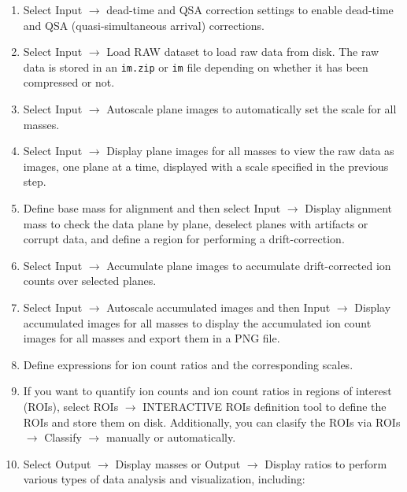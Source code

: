 \documentclass[a4paper, 11pt]{article}
\newcommand{\ttt}[1]{\texttt{#1}}
\newcommand{\lans}[1]{{\color{magenta}#1}}
\newcommand{\lanscb}[1]{{\color{darkgreen}#1}}
\newcommand{\lanstf}[1]{{\color{cyan}#1}}
\newcommand\ra{\rightarrow}
\newcounter{step}
\begin{document}
\begin{enumerate}

\item Select \lans{Input} $\ra$ \lans{dead-time and QSA correction settings} to enable dead-time and QSA (quasi-simultaneous arrival) corrections.

\item Select \lans{Input} $\ra$ \lans{Load RAW dataset} to load raw data from disk. The raw data is stored in an \ttt{im.zip} or \ttt{im} file depending on whether it has been compressed or not.

\item Select \lans{Input} $\ra$ \lans{Autoscale plane images} to automatically set the scale for all masses. 

\item Select \lans{Input} $\ra$ \lans{Display plane images for all masses} to view the raw data as images, one plane at a time, displayed with a scale specified in the previous step. 

\item Define \lanstf{base mass for alignment} and then select \lans{Input} $\ra$ \lans{Display alignment mass} to check the data plane by plane, \lanscb{deselect planes} with artifacts or corrupt data, and \lans{define a region} for performing a drift-correction. 

\item Select \lans{Input} $\ra$ \lans{Accumulate plane images} to accumulate drift-corrected ion counts over selected planes.  

\item Select \lans{Input} $\ra$ \lans{Autoscale accumulated images} and then \lans{Input} $\ra$ \lans{Display accumulated images for all masses} to display the accumulated ion count images for all masses and export them in a PNG file.

\item Define \lanstf{expressions} for ion count ratios and the corresponding \lanstf{scales}. 

\item If you want to quantify ion counts and ion count ratios in regions of interest (ROIs), select \lans{ROIs} $\ra$ \lans{INTERACTIVE ROIs definition tool} to define the ROIs and store them on disk. Additionally, you can clasify the ROIs via \lans{ROIs} $\ra$ \lans{Classify} $\ra$ \lans{manually} or \lans{automatically}.

\item Select \lans{Output} $\ra$ \lans{Display masses} or \lans{Output} $\ra$ \lans{Display ratios} to perform various types of data analysis and visualization, including:


\end{enumerate}
\end{document}
